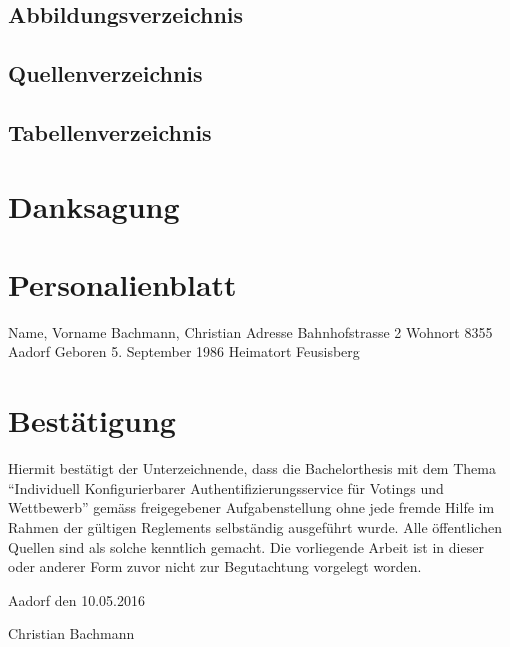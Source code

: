 \section{Abbildungsverzeichnis}\label{abbildungsverzeichnis}

\renewcommand{\listfigurename}{} 

\begingroup\let\clearpage\relax
\listoffigures
\endgroup

\pagebreak

\section{Quellenverzeichnis}\label{quellenverzeichnis}

\renewcommand{\bibname}{}

\begingroup \let\clearpage\relax
\printbibliography
\endgroup

\pagebreak

\section{Tabellenverzeichnis}\label{tabellenverzeichnis}

\renewcommand{\listtablename}{} 

\begingroup \let\clearpage\relax
\listoftables
\endgroup

\newpage

\chapter{Danksagung}\label{danksagung}

\newpage

\chapter{Personalienblatt}\label{personalienblatt}

Name, Vorname Bachmann, Christian Adresse Bahnhofstrasse 2 Wohnort 8355
Aadorf Geboren 5. September 1986 Heimatort Feusisberg

\newpage

\chapter{Bestätigung}\label{bestuxe4tigung}

Hiermit bestätigt der Unterzeichnende, dass die Bachelorthesis mit dem
Thema ``Individuell Konfigurierbarer Authentifizierungsservice für
Votings und Wettbewerb'' gemäss freigegebener Aufgabenstellung ohne jede
fremde Hilfe im Rahmen der gültigen Reglements selbständig ausgeführt
wurde. Alle öffentlichen Quellen sind als solche kenntlich gemacht. Die
vorliegende Arbeit ist in dieser oder anderer Form zuvor nicht zur
Begutachtung vorgelegt worden.

Aadorf den 10.05.2016

Christian Bachmann





